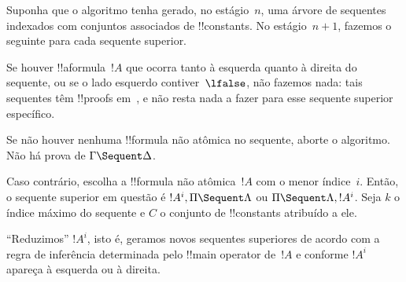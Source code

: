 \documentclass[../../../include/open-logic-section]{subfiles}
\begin{document}
Suponha que o algoritmo tenha gerado, no estágio~$n$, uma árvore de
sequentes indexados com conjuntos associados de !!{constant}s. No
estágio~$n+1$, fazemos o seguinte para cada sequente superior.

Se houver !!a{formula}~$!A$ que ocorra tanto à esquerda quanto à direita
do sequente, ou se o lado esquerdo contiver~$\lfalse$, não fazemos nada:
tais sequentes têm !!{proof}s em~, e não resta nada a fazer
para esse sequente superior específico.

Se não houver nenhuma !!{formula} não atômica no sequente, aborte o
algoritmo. Não há prova de $\Gamma \Sequent \Delta$.

Caso contrário, escolha a !!{formula} não atômica~$!A$ com o menor
índice~$i$. Então, o sequente superior em questão é $!A^i, \Pi \Sequent
\Lambda$ ou $\Pi \Sequent \Lambda, !A^i$. Seja $k$ o índice máximo do
sequente e $C$ o conjunto de !!{constant}s atribuído a ele.

``Reduzimos'' $!A^i$, isto é, geramos novos sequentes superiores de
acordo com a regra de inferência determinada pelo !!{main operator}
de~$!A$ e conforme $!A^i$ apareça à esquerda ou à direita.
\end{document}
